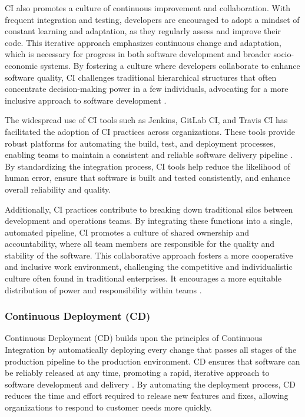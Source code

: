 \begin{refsection}
CI also promotes a culture of continuous improvement and collaboration. With frequent integration and testing, developers are encouraged to adopt a mindset of constant learning and adaptation, as they regularly assess and improve their code. This iterative approach emphasizes continuous change and adaptation, which is necessary for progress in both software development and broader socio-economic systems. By fostering a culture where developers collaborate to enhance software quality, CI challenges traditional hierarchical structures that often concentrate decision-making power in a few individuals, advocating for a more inclusive approach to software development \cite[pp.~157-180]{womack2013lean}.

The widespread use of CI tools such as Jenkins, GitLab CI, and Travis CI has facilitated the adoption of CI practices across organizations. These tools provide robust platforms for automating the build, test, and deployment processes, enabling teams to maintain a consistent and reliable software delivery pipeline \cite[pp.~201-220]{smart2011jenkins}. By standardizing the integration process, CI tools help reduce the likelihood of human error, ensure that software is built and tested consistently, and enhance overall reliability and quality.

Additionally, CI practices contribute to breaking down traditional silos between development and operations teams. By integrating these functions into a single, automated pipeline, CI promotes a culture of shared ownership and accountability, where all team members are responsible for the quality and stability of the software. This collaborative approach fosters a more cooperative and inclusive work environment, challenging the competitive and individualistic culture often found in traditional enterprises. It encourages a more equitable distribution of power and responsibility within teams \cite[pp.~157-180]{womack2013lean}.

\subsubsection{Continuous Deployment (CD)}

Continuous Deployment (CD) builds upon the principles of Continuous Integration by automatically deploying every change that passes all stages of the production pipeline to the production environment. CD ensures that software can be reliably released at any time, promoting a rapid, iterative approach to software development and delivery \cite[pp.~91-120]{humble2019continuous}. By automating the deployment process, CD reduces the time and effort required to release new features and fixes, allowing organizations to respond to customer needs more quickly.


\end{refsection}
